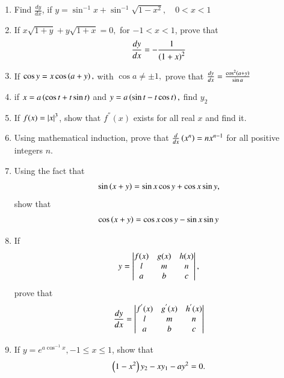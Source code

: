 \begin{enumerate}[label=\arabic*.,ref=\thesubsection.\theenumi]
\item Find $\frac{dy}{dx}$, if 
$
y = \sin ^{-1}x + \sin^{-1}\sqrt{1-x^2}, \quad 0 < x < 1
$
\item If 
$
x\sqrt{1+y}+y\sqrt{1+x} = 0,
$
for $-1<x<1$, prove that
%
\begin{align}
\frac{dy}{dx} = -\frac{1}{\left(1+x\right)^2}
\end{align}
\item If
$
\cos y = x \cos\left(a+y\right), 
$
with 
$
\cos a \ne \pm 1,
$
prove that 
$
\frac{dy}{dx}= \frac{\cos^2\left(a+y\right)}{\sin a}
$
\item if 
$
x = a \left(\cos t + t\sin t\right)
$
and
$
y = a \left(\sin t - t\cos t \right), 
$
find $y_2$
\item If $f(x) =\left\vert x\right\vert^3$, show that $f^{''}(x)$ exists for all real $x$ and find it.
\item Using mathematical induction, prove that $\frac{d}{dx}\left(x^n\right) = nx^{n-1}$ for all positive integers $n$.
\item Using the fact that 
\begin{align}
\sin\left(x+y\right) = \sin x \cos y +\cos x \sin y,
\end{align}
%
show that 
\begin{align}
\cos\left(x+y\right) = \cos x \cos y -\sin x \sin y
\end{align}
\item If 
\begin{align}
y = 
\begin{vmatrix}
f(x) & g(x) & h(x)
\\
l &m & n
\\
a & b & c
\end{vmatrix},
\end{align}
%
prove that 
\begin{align}
\frac{dy}{dx} = 
\begin{vmatrix}
f^{'}(x) & g^{'}(x) & h^{'}(x)
\\
l &m & n
\\
a & b & c
\end{vmatrix}
\end{align}
\item If $y = e^{a\cos^{-1}x}, - 1 \le x \le 1$, show that 
\begin{align}
\left(1-x^2\right)y_2-xy_1-ay^2 = 0.
\end{align}
%

\end{enumerate}

